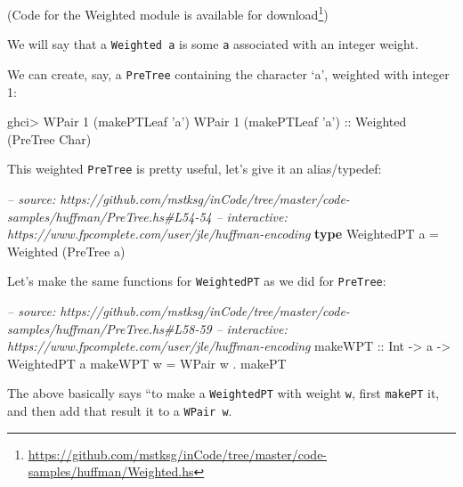 \documentclass[]{article}
\newenvironment{Shaded}{}{}
\newcommand{\KeywordTok}[1]{\textcolor[rgb]{0.00,0.44,0.13}{\textbf{{#1}}}}
\newcommand{\DataTypeTok}[1]{\textcolor[rgb]{0.56,0.13,0.00}{{#1}}}
\newcommand{\DecValTok}[1]{\textcolor[rgb]{0.25,0.63,0.44}{{#1}}}
\newcommand{\CharTok}[1]{\textcolor[rgb]{0.25,0.44,0.63}{{#1}}}
\newcommand{\CommentTok}[1]{\textcolor[rgb]{0.38,0.63,0.69}{\textit{{#1}}}}
\newcommand{\OtherTok}[1]{\textcolor[rgb]{0.00,0.44,0.13}{{#1}}}
\newcommand{\FunctionTok}[1]{\textcolor[rgb]{0.02,0.16,0.49}{{#1}}}
\newcommand{\NormalTok}[1]{{#1}}
\renewcommand{\href}[2]{#2\footnote{\url{#1}}}
\begin{document}
(Code for the Weighted module is
\href{https://github.com/mstksg/inCode/tree/master/code-samples/huffman/Weighted.hs}{available
for download})

We will say that a \texttt{Weighted\ a} is some \texttt{a} associated with an
integer weight.

We can create, say, a \texttt{PreTree} containing the character `a', weighted
with integer 1:

\begin{Shaded}
\begin{Highlighting}[]
\NormalTok{ghci}\FunctionTok{>} \DataTypeTok{WPair} \DecValTok{1} \NormalTok{(makePTLeaf }\CharTok{'a'}\NormalTok{)}
\DataTypeTok{WPair} \DecValTok{1} \NormalTok{(makePTLeaf }\CharTok{'a'}\NormalTok{)}\OtherTok{ ::} \DataTypeTok{Weighted} \NormalTok{(}\DataTypeTok{PreTree} \DataTypeTok{Char}\NormalTok{)}
\end{Highlighting}
\end{Shaded}

This weighted \texttt{PreTree} is pretty useful, let's give it an alias/typedef:

\begin{Shaded}
\begin{Highlighting}[]
\CommentTok{-- source: https://github.com/mstksg/inCode/tree/master/code-samples/huffman/PreTree.hs#L54-54}
\CommentTok{-- interactive: https://www.fpcomplete.com/user/jle/huffman-encoding}
\KeywordTok{type} \DataTypeTok{WeightedPT} \NormalTok{a }\FunctionTok{=} \DataTypeTok{Weighted} \NormalTok{(}\DataTypeTok{PreTree} \NormalTok{a)}
\end{Highlighting}
\end{Shaded}

Let's make the same functions for \texttt{WeightedPT} as we did for
\texttt{PreTree}:

\begin{Shaded}
\begin{Highlighting}[]
\CommentTok{-- source: https://github.com/mstksg/inCode/tree/master/code-samples/huffman/PreTree.hs#L58-59}
\CommentTok{-- interactive: https://www.fpcomplete.com/user/jle/huffman-encoding}
\OtherTok{makeWPT ::} \DataTypeTok{Int} \OtherTok{->} \NormalTok{a }\OtherTok{->} \DataTypeTok{WeightedPT} \NormalTok{a}
\NormalTok{makeWPT w }\FunctionTok{=} \DataTypeTok{WPair} \NormalTok{w }\FunctionTok{.} \NormalTok{makePT}
\end{Highlighting}
\end{Shaded}

The above basically says ``to make a \texttt{WeightedPT} with weight \texttt{w},
first \texttt{makePT} it, and then add that result it to a \texttt{WPair\ w}.
\end{document}
